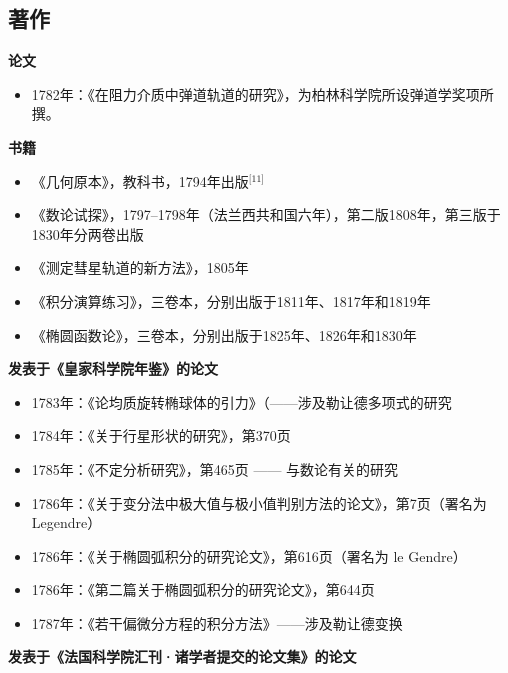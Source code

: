\subsection{著作}
\textbf{论文}
\begin{itemize}
\item 1782年：《在阻力介质中弹道轨道的研究》，为柏林科学院所设弹道学奖项所撰。
\end{itemize}
\textbf{书籍}
\begin{itemize}
\item 《几何原本》，教科书，1794年出版\(^\text{[11]}\)
\item 《数论试探》，1797–1798年（法兰西共和国六年），第二版1808年，第三版于1830年分两卷出版
\item 《测定彗星轨道的新方法》，1805年
\item 《积分演算练习》，三卷本，分别出版于1811年、1817年和1819年
\item 《椭圆函数论》，三卷本，分别出版于1825年、1826年和1830年
\end{itemize}
\textbf{发表于《皇家科学院年鉴》的论文}
\begin{itemize}
\item 1783年：《论均质旋转椭球体的引力》（——涉及勒让德多项式的研究
\item 1784年：《关于行星形状的研究》，第370页
\item 1785年：《不定分析研究》，第465页 —— 与数论有关的研究
\item 1786年：《关于变分法中极大值与极小值判别方法的论文》，第7页（署名为 Legendre）
\item 1786年：《关于椭圆弧积分的研究论文》，第616页（署名为 le Gendre）
\item 1786年：《第二篇关于椭圆弧积分的研究论文》，第644页
\item 1787年：《若干偏微分方程的积分方法》——涉及勒让德变换
\end{itemize}
\textbf{发表于《法国科学院汇刊·诸学者提交的论文集》的论文}
